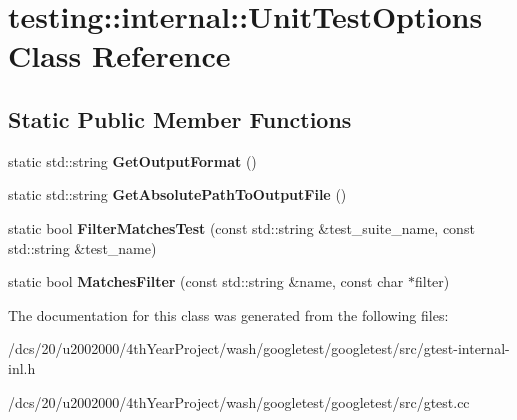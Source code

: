 \hypertarget{classtesting_1_1internal_1_1UnitTestOptions}{}\section{testing\+:\+:internal\+:\+:Unit\+Test\+Options Class Reference}
\label{classtesting_1_1internal_1_1UnitTestOptions}
\subsection*{Static Public Member Functions}
\begin{DoxyCompactItemize}
\item 
\mbox{\label{classtesting_1_1internal_1_1UnitTestOptions_ae7413a21296d885c6924650b51ac4f6d}} 
static std\+::string {\bfseries Get\+Output\+Format} ()
\item 
\mbox{\label{classtesting_1_1internal_1_1UnitTestOptions_a8b29c6a22fd2f904c6b0453e403f58fa}} 
static std\+::string {\bfseries Get\+Absolute\+Path\+To\+Output\+File} ()
\item 
\mbox{\label{classtesting_1_1internal_1_1UnitTestOptions_afb26e5771f3a78b8d41ca2f47e4eb451}} 
static bool {\bfseries Filter\+Matches\+Test} (const std\+::string \&test\+\_\+suite\+\_\+name, const std\+::string \&test\+\_\+name)
\item 
\mbox{\label{classtesting_1_1internal_1_1UnitTestOptions_a67fc0adaffbb8d320b92e42e05017e4e}} 
static bool {\bfseries Matches\+Filter} (const std\+::string \&name, const char $\ast$filter)
\end{DoxyCompactItemize}


The documentation for this class was generated from the following files\+:\begin{DoxyCompactItemize}
\item 
/dcs/20/u2002000/4th\+Year\+Project/wash/googletest/googletest/src/gtest-\/internal-\/inl.\+h\item 
/dcs/20/u2002000/4th\+Year\+Project/wash/googletest/googletest/src/gtest.\+cc\end{DoxyCompactItemize}
